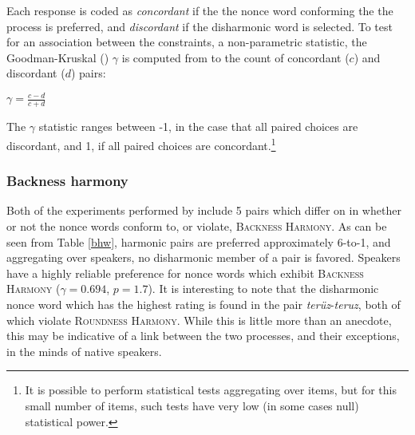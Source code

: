 Each response is coded as \emph{concordant} if the the nonce word conforming the the process is preferred, and \emph{discordant} if the disharmonic word is selected. To test for an association between the constraints, a non-parametric statistic, the Goodman-Kruskal (\citeyear{Goodman1954}) $\gamma$ is computed from to the count of concordant ($c$) and discordant ($d$) pairs:

\begin{unlabeledexample}
$\displaystyle \gamma = \frac{c - d}{c + d}$
\end{unlabeledexample}

\noindent
The $\gamma$ statistic ranges between -1, in the case that all paired choices are discordant, and 1, if all paired choices are concordant.\footnote{It is possible to perform statistical tests aggregating over items, but for this small number of items, such tests have very low (in some cases null) statistical power.}

\subsubsection{Backness harmony}

Both of the experiments performed by \citet{Zimmer1969} include 5 pairs which differ on in whether or not the nonce words conform to, or violate, \textsc{Backness Harmony}. As can be seen from Table \ref{bhw}, harmonic pairs are preferred approximately 6-to-1, and aggregating over speakers, no disharmonic member of a pair is favored. Speakers have a highly reliable preference for nonce words which exhibit \textsc{Backness Harmony} ($\gamma = 0.694$, $p = 1.7$). It is interesting to note that the disharmonic nonce word which has the highest rating is found in the pair \emph{terüz}-\emph{teruz}, both of which violate \textsc{Roundness Harmony}. While this is little more than an anecdote, this may be  indicative of a link between the two processes, and their exceptions, in the minds of native speakers. 

